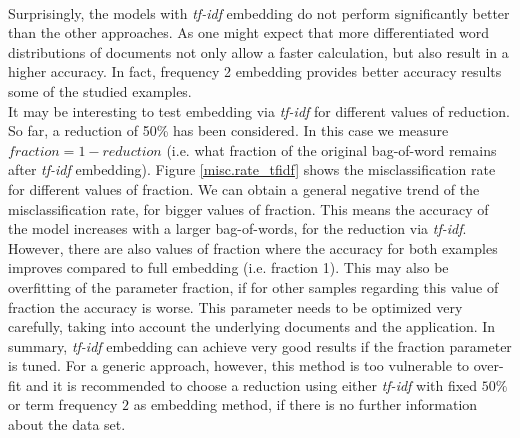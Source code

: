 \documentclass[11pt,a4paper]{article}
\begin{document}
\ \\
Surprisingly, the models with \textit{tf-idf} embedding do not perform significantly better than the other approaches. As one might expect that more differentiated word distributions of documents not only allow a faster calculation, but also result in a higher accuracy. In fact, frequency 2 embedding provides better accuracy results some of the studied examples.\\
It may be interesting to test embedding via \textit{tf-idf} for different values of reduction. So far, a reduction of 50\% has been considered. In this case we measure $\textit{fraction}=1-\textit{reduction}$ (i.e. what fraction of the original bag-of-word remains after \textit{tf-idf} embedding). Figure \ref{misc.rate_tfidf} shows the misclassification rate for different values of fraction. We can obtain a general negative trend of the misclassification rate, for bigger values of fraction. This means the accuracy of the model increases with a larger bag-of-words, for the reduction via \textit{tf-idf}. However, there are also values of fraction where the accuracy for both examples improves compared to full embedding (i.e. fraction 1). This may also be overfitting of the parameter fraction, if for other samples regarding this value of fraction the accuracy is worse. This parameter needs to be optimized very carefully, taking into account the underlying documents and the application. In summary, \textit{tf-idf} embedding can achieve very good results if the fraction parameter is tuned. For a generic approach, however, this method is too vulnerable to over-fit and it is recommended to choose a reduction using either \textit{tf-idf} with fixed $50\%$ or term frequency $2$ as embedding method, if there is no further information about the data set.\\
\end{document}
